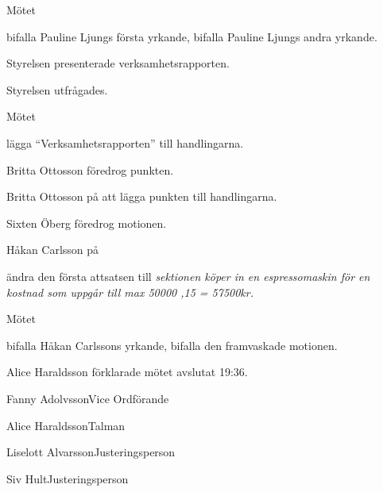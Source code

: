 \documentclass{dsekminutes}
\begin{document}
Mötet 
\begin{attlist}
  \att bifalla Pauline Ljungs första yrkande,
  \att bifalla Pauline Ljungs andra yrkande.
\end{attlist}

Styrelsen presenterade verksamhetsrapporten.

Styrelsen utfrågades.

Mötet 
\begin{attlist}
  \att lägga “Verksamhetsrapporten” till handlingarna.
\end{attlist}

Britta Ottosson föredrog punkten.

Britta Ottosson \yrkade på att lägga punkten till handlingarna.

Sixten Öberg föredrog motionen.

Håkan Carlsson  på
\begin{attlist}
  \att ändra den första attsatsen till \emph{sektionen köper in en
  espresso\-maskin för en kostnad som uppgår till max 50000 ,15 =
  57500kr.}
\end{attlist}

Mötet 
\begin{attlist}
  \att bifalla Håkan Carlssons yrkande,
  \att bifalla den framvaskade motionen.
\end{attlist}

Alice Haraldsson förklarade mötet avslutat 19:36.

\vspace{5cm}

\signature{Vid protokollet}{Fanny Adolvsson}{Vice Ordförande}
\signature{Mötesordförande}{Alice Haraldsson}{Talman}
\signature{Justeras}{Liselott Alvarsson}{Justeringsperson}
\signature{Justeras}{Siv Hult}{Justeringsperson}
\end{document}
